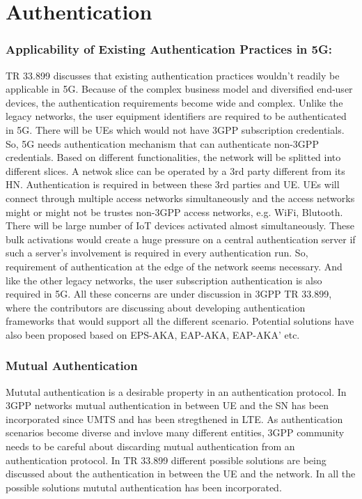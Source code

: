 \documentclass[lnicst,sechang,a4paper]{svmultln}
\begin{document}
\section{Authentication}
\label{sec:authentication}

\subsubsection{Applicability of Existing Authentication Practices in 5G:}
TR 33.899 discusses that existing authentication practices wouldn't readily be applicable in 5G. Because of the complex business model and diversified end-user devices, the authentication requirements become wide and complex. Unlike the legacy networks, the user equipment identifiers are required to be authenticated in 5G. There will be UEs which would not have 3GPP subscription credentials. So, 5G needs authentication mechanism that can authenticate non-3GPP credentials. Based on different functionalities, the network will be splitted into different slices. A netwok slice can be operated by a 3rd party different from its HN. Authentication is required in between these 3rd parties and UE. UEs will connect through multiple access networks simultaneously and the access networks might or might not be trustes non-3GPP access networks, e.g. WiFi, Blutooth. There will be large number of IoT devices activated almost simultaneously. These bulk activations would create a huge pressure on a central authentication server if such a server's involvement is required in every authentication run. So, requirement of authentication at the edge of the network seems necessary. And like the other legacy networks, the user subscription authentication is also required in 5G. All these concerns are under discussion in 3GPP TR 33.899, where the contributors are discussing about developing authentication frameworks that would support all the different scenario. Potential solutions have also been proposed based on EPS-AKA, EAP-AKA, EAP-AKA' etc.

\subsubsection{Mutual Authentication}
Mututal authentication is a desirable property in an authentication protocol. In 3GPP networks mutual authentication in between UE and the SN has been incorporated since UMTS and has been stregthened in LTE. As authentication scenarios become diverse and invlove many different entities, 3GPP community needs to be careful about discarding mutual authentication from an authentication protocol. In TR 33.899 different possible solutions are being discussed about the authentication in between the UE and the network. In all the possible solutions mututal authentication has been incorporated. 
\end{document}
